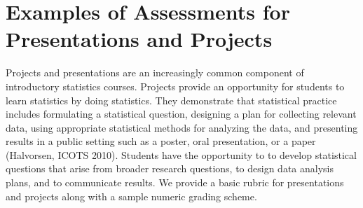 \section{\textbf{Examples of Assessments for Presentations and Projects}}

Projects and presentations are an increasingly 
common component of introductory statistics courses.  
 Projects provide an opportunity for 
students to learn statistics by doing statistics.  They demonstrate that statistical practice includes
formulating a statistical question, designing a plan for collecting relevant data, using appropriate
statistical methods for analyzing the data, and presenting results in a public setting such as a poster,
oral presentation, or a paper (Halvorsen, ICOTS 2010). 
Students have the opportunity to 
to develop statistical questions that arise from broader research questions, to design data
analysis plans, and to communicate results.
We provide a basic rubric for presentations and projects along with a sample numeric grading scheme.

